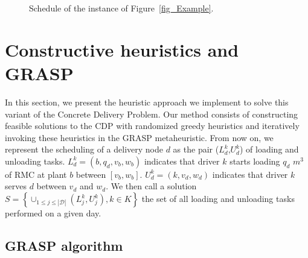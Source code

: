 \documentclass{article}
\begin{document}
\begin{figure}[htbp]
\begin{adjustbox}{max width=0.85\textwidth}
    \end{adjustbox}
    \caption{Schedule of the instance of Figure~\ref{fig_Example}.}
    \label{fig:ganttExample}
\end{figure}


\section{Constructive heuristics and GRASP}
\label{grasp_method}

In this section, we present the heuristic approach we implement to solve this variant of the Concrete Delivery Problem. Our method consists of constructing feasible solutions to the CDP with randomized greedy heuristics and iteratively invoking these heuristics in the GRASP metaheuristic. From now on, we represent the scheduling of a delivery node $d$ as the pair  ($L^k_{d}$,$U^k_{d}$) of loading  and unloading  tasks. $L^k_{d} = \left(b,q_d,v_b,w_b\right)$ indicates that driver $k$ starts loading $q_d$ $m^3$ of RMC at plant $b$ between $\left[v_b,w_b\right]$. $U^k_{d} = \left(k,v_d, w_d\right)$ indicates that driver $k$ serves $d$ between $v_d$ and $w_d$. We then call a solution $ S =\left\lbrace \cup _{1 \leq j \leq |\mathcal{D}|} (L^k_{j}, U^k_{j}), k \in K \right\rbrace$ the set of all loading and unloading tasks performed on a given day.

\subsection{GRASP algorithm }
\end{document}
